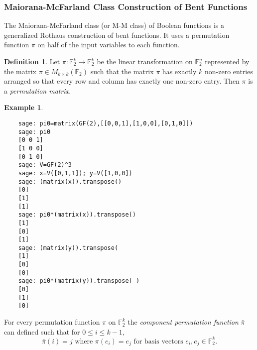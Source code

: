 \documentclass[english]{article}
\def\gftwo{\mathbb{F}_2}
\theoremstyle{plain}
\theoremstyle{definition}
\newtheorem{definition}[theorem]{Definition}%
\newtheorem{example}[theorem]{Example}
\theoremstyle{remark}
\begin{document}
\subsubsection{Maiorana-McFarland Class Construction of Bent
Functions}\label{subsec:mm-class}
\par The Maiorana-McFarland class (or M-M class) of Boolean functions is a
generalized Rothaus construction of bent functions. It uses a
permutation function $\pi$ on half of the input variables to each function.

\begin{definition}
  Let $\pi:\gftwo^k\rightarrow\gftwo^k$ be the linear transformation on
  $\gftwo^n$ represented by the matrix $\pi\in M_{k\times k}(\gftwo)$ such that the
  matrix $\pi$ has exactly $k$ non-zero entries arranged so that every row
  and column has exactly one non-zero entry. Then $\pi$ is a
  {\it permutation matrix}.
\end{definition}

\begin{example}
  \ 
  \begin{lstlisting}
    sage: pi0=matrix(GF(2),[[0,0,1],[1,0,0],[0,1,0]])
    sage: pi0
    [0 0 1]
    [1 0 0]
    [0 1 0]
    sage: V=GF(2)^3
    sage: x=V([0,1,1]); y=V([1,0,0])
    sage: (matrix(x)).transpose()
    [0]
    [1]
    [1]
    sage: pi0*(matrix(x)).transpose()
    [1]
    [0]
    [1]
    sage: (matrix(y)).transpose(
    [1]
    [0]
    [0]
    sage: pi0*(matrix(y)).transpose( )
    [0]
    [1]
    [0]
  \end{lstlisting}
\end{example}

\par For every permutation function $\pi$ on $\gftwo^k$ the {\it component permutation
function} $\bar{\pi}$ can defined such that for $0 \leq i \leq k-1$,
\[
\bar{\pi}(i)=j \text{ where } \pi(e_i)=e_j \text{ for basis vectors } e_i,
e_j\in\gftwo^k.
\]
\end{document}
